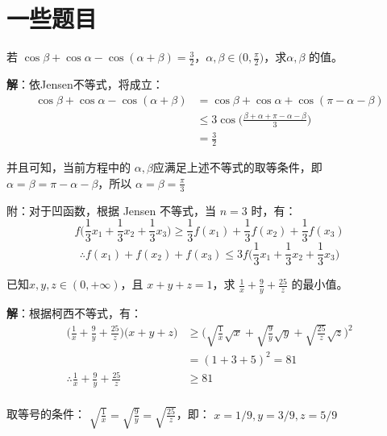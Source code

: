 \documentclass[12pt]{article}
\begin{document}
\section{一些题目}
\begin{framed}
若 $\cos\beta + \cos \alpha - \cos(\alpha + \beta) = \frac{3}{2}$，$\alpha, \beta \in \Big(0, \frac{\pi}{2}\Big)$，求$\alpha, \beta$ 的值。

\textbf{解}：依Jensen不等式，将成立：
\begin{align*}
\cos\beta + \cos \alpha - \cos(\alpha + \beta) &= \cos\beta + \cos \alpha + \cos(\pi - \alpha - \beta) \\
	&\le 3 \cos\Big(\frac{\beta + \alpha + \pi - \alpha - \beta}{3}\Big)\\
	&= \frac{3}{2}
\end{align*}

并且可知，当前方程中的 $\alpha, \beta $应满足上述不等式的取等条件，即$\alpha = \beta = \pi - \alpha - \beta$，所以 $\alpha = \beta = \frac{\pi}{3}$

\begin{framed}
\small{
附：对于凹函数，根据 Jensen 不等式，当 $n = 3$ 时，有：
$$
f\Big(\frac{1}{3}x_1 + \frac{1}{3}x_2 + \frac{1}{3}x_3\Big) \ge \frac{1}{3}f(x_1) + \frac{1}{3}f(x_2) + \frac{1}{3}f(x_3)
$$
$$
\therefore f(x_1) + f(x_2) + f(x_3) \le 3f\Big(\frac{1}{3}x_1 + \frac{1}{3}x_2 + \frac{1}{3}x_3\Big)
$$
}
\end{framed}
\end{framed}

\begin{framed}
已知$x,y,z \in (0, +\infty)$，且 $x + y + z = 1$，求 $\frac{1}{x} + \frac{9}{y} + \frac{25}{z}$ 的最小值。

\textbf{解}：根据柯西不等式，有：
\begin{align*}
\Big(\frac{1}{x} + \frac{9}{y} + \frac{25}{z}\Big)\Big(x + y + z\Big) &\ge \Big(\sqrt{\frac{1}{x}}\sqrt{x} + \sqrt{\frac{9}{y}}\sqrt{y} + \sqrt{\frac{25}{z}}\sqrt{z}\Big) ^2\\
    &= (1 + 3 + 5)^2 = 81 \\
\therefore \frac{1}{x} + \frac{9}{y} + \frac{25}{z} &\ge 81 \\
\end{align*}

取等号的条件： $\sqrt{\frac{1}{x}} = \sqrt{\frac{9}{y}} = \sqrt{\frac{25}{z}}$，即： $x = 1/9, y = 3/9, z = 5/9$
\end{framed}
\end{document}
